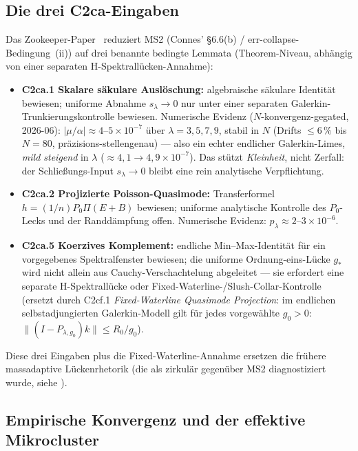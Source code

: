 \documentclass[12pt,a4paper]{article}
\theoremstyle{definition}
\theoremstyle{remark}
\begin{document}
\subsection{Die drei C2ca-Eingaben}
\label{sec:c2ca-inputs}

Das Zookeeper-Paper~\cite{Geiger2026zookeeper} reduziert
MS2 (Connes' \S6.6(b) / err-collapse-Bedingung~(ii)) auf drei benannte
bedingte Lemmata (Theorem-Niveau, abhängig von einer separaten
H-Spektrallücken-Annahme):

\begin{itemize}
  \item \textbf{C2ca.1 Skalare säkulare Auslöschung:} algebraische
    säkulare Identität bewiesen; uniforme Abnahme $s_\lambda \to 0$ nur
    unter einer separaten Galerkin-Trunkierungskontrolle bewiesen.
    Numerische Evidenz ($N$-konvergenz-gegated, 2026-06):
    $|\mu/\alpha|\approx 4\text{--}5\times 10^{-7}$ über
    $\lambda = 3,5,7,9$, stabil in $N$ (Drifts $\le 6\,\%$ bis $N{=}80$,
    präzisions-stellengenau) --- also ein echter endlicher
    Galerkin-Limes, \emph{mild steigend} in $\lambda$
    ($\approx 4{,}1 \to 4{,}9 \times 10^{-7}$). Das stützt
    \emph{Kleinheit}, nicht Zerfall: der Schließungs-Input
    $s_\lambda \to 0$ bleibt eine rein analytische Verpflichtung.
  \item \textbf{C2ca.2 Projizierte Poisson-Quasimode:} Transferformel
    $h = (1/n)P_0\Pi(E+B)$ bewiesen; uniforme analytische Kontrolle
    des $P_0$-Lecks und der Randdämpfung offen. Numerische Evidenz:
    $p_\lambda \approx 2\text{--}3\times 10^{-6}$.
  \item \textbf{C2ca.5 Koerzives Komplement:} endliche Min--Max-Identität
    für ein vorgegebenes Spektralfenster bewiesen; die uniforme
    Ordnung-eins-Lücke $g_*$ wird nicht allein aus Cauchy-Verschachtelung
    abgeleitet --- sie erfordert eine separate H-Spektrallücke oder
    Fixed-Waterline-/Slush-Collar-Kontrolle (ersetzt durch C2cf.1
    \emph{Fixed-Waterline Quasimode Projection}: im endlichen
    selbstadjungierten Galerkin-Modell gilt für jedes vorgewählte $g_0>0$:
    $\|(I-P_{\lambda,g_0})k\|\leq R_0/g_0$).
\end{itemize}

Diese drei Eingaben plus die Fixed-Waterline-Annahme ersetzen die
frühere massadaptive Lückenrhetorik (die als zirkulär gegenüber MS2
diagnostiziert wurde, siehe ).


\subsection{Empirische Konvergenz und der effektive Mikrocluster}
\label{sec:branch-z-empirics}
\end{document}
